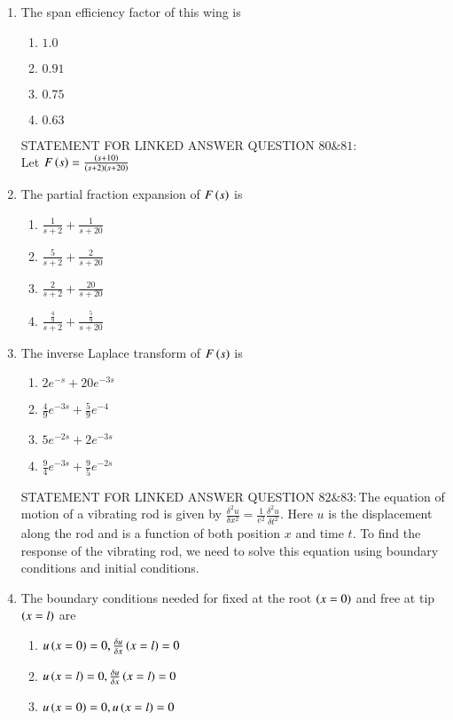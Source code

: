 \documentclass[journal]{IEEEtran}
\begin{document}
\begin{enumerate}
    \item The span efficiency factor of this wing is 
    \begin{enumerate}
        \item $1.0$
        \item $0.91$
        \item $0.75$
        \item $0.63$
    \end{enumerate}
    STATEMENT FOR LINKED ANSWER QUESTION $80\&81:$\\
    Let $F\left(s\right)=\frac{\left(s+10\right)}{\left(s+2\right)\left(s+20\right)}$
    \item The partial fraction expansion of $F\left(s\right)$ is
    \begin{enumerate}
        \item $\frac{1}{s+2}+\frac{1}{s+20}$
        \item $\frac{5}{s+2}+\frac{2}{s+20}$
        \item $\frac{2}{s+2}+\frac{20}{s+20}$
        \item $\frac{\frac{4}{9}}{s+2}+\frac{\frac{5}{9}}{s+20}$
    \end{enumerate}
    \item The inverse Laplace transform of $F\left(s\right)$ is
    \begin{enumerate}
        \item $2e^{-s}+20e^{-3s}$
        \item $\frac{4}{9}e^{-3s}+\frac{5}{9}e^{-4}$
        \item $5e^{-2s}+2e^{-3s}$
        \item $\frac{9}{4}e^{-3s}+\frac{9}{5}e^{-2s}$
    \end{enumerate}
    STATEMENT FOR LINKED ANSWER QUESTION $82\&83:$The equation of motion of a vibrating rod is given by $\frac{\delta^2 u}{\delta x^2}=\frac{1}{e^2}\frac{\delta^2 u}{\delta t^2}.$ Here $u$ is the displacement along the rod and is a function of both position $x$ and time $t$. To find the response of the vibrating rod, we need to solve this equation using boundary conditions and initial conditions.
    \item The boundary conditions needed for fixed at the root $\left(x=0\right)$ and free at tip $\left(x=l\right)$ are
    \begin{enumerate}
        \item $u\left(x=0\right)=0,\frac{\delta u}{\delta x}\left(x=l\right)=0$
        \item $u\left(x=l\right)=0,\frac{\delta u}{\delta x}\left(x=l\right)=0$
        \item $u\left(x=0\right)=0,u\left(x=l\right)=0$

\end{enumerate}
\end{enumerate}
\end{document}
